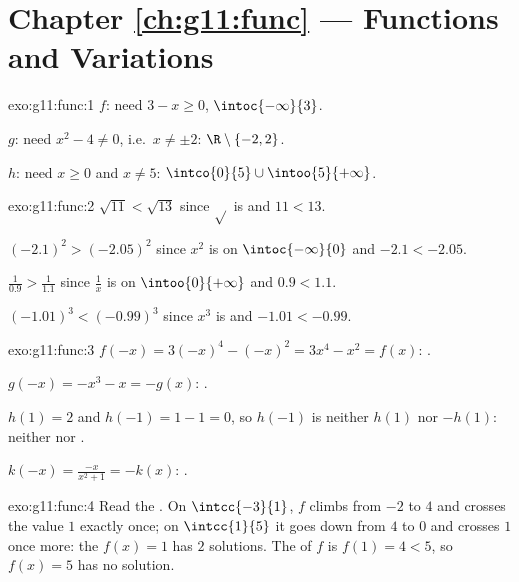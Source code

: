 \section*{Chapter \ref{ch:g11:func} --- Functions and Variations}

\begin{solution}{exo:g11:func:1}
$f$: need $3 - x \geq 0$,  $\intoc{-\infty}{3}$.

$g$: need $x^2 - 4 \neq 0$, i.e.\ $x \neq \pm 2$: 
$\R \setminus \{-2, 2\}$.

$h$: need $x \geq 0$ and $x \neq 5$: 
$\intco{0}{5} \cup \intoo{5}{+\infty}$.
\end{solution}

\begin{solution}{exo:g11:func:2}
$\sqrt{11} < \sqrt{13}$ since $\sqrt{}$ is  and $11 < 13$.

$(-2.1)^2 > (-2.05)^2$ since $x^2$ is  on
$\intoc{-\infty}{0}$ and $-2.1 < -2.05$.

$\frac{1}{0.9} > \frac{1}{1.1}$ since $\frac1x$ is  on
$\intoo{0}{+\infty}$ and $0.9 < 1.1$.

$(-1.01)^3 < (-0.99)^3$ since $x^3$ is  and $-1.01 < -0.99$.
\end{solution}

\begin{solution}{exo:g11:func:3}
$f(-x) = 3(-x)^4 - (-x)^2 = 3x^4 - x^2 = f(x)$: .

$g(-x) = -x^3 - x = -g(x)$: .

$h(1) = 2$ and $h(-1) = 1 - 1 = 0$, so $h(-1)$ is neither $h(1)$ nor
$-h(1)$: neither  nor .

$k(-x) = \frac{-x}{x^2+1} = -k(x)$: .
\end{solution}

\begin{solution}{exo:g11:func:4}
Read the . On $\intcc{-3}{1}$, $f$ climbs from $-2$ to $4$
and crosses the value $1$ exactly once; on $\intcc{1}{5}$ it goes down
from $4$ to $0$ and crosses $1$ once more: the  $f(x) = 1$ has
$2$ solutions. The  of $f$ is $f(1) = 4 < 5$, so $f(x) = 5$ has no
solution.
\end{solution}

